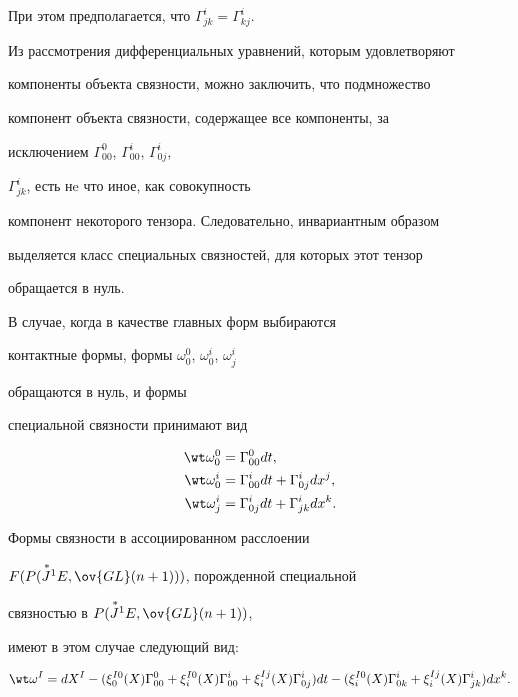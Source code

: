 При этом предполагается, что $\Gamma^i_{jk}=\Gamma^i_{kj}$. 


 


Из рассмотрения дифференциальных уравнений, которым удовлетворяют 


компоненты объекта связности, можно заключить, что подмножество 


компонент объекта связности, содержащее все компоненты, за 


исключением $\Gamma^0_{00}$, $\Gamma^i_{00}$, $\Gamma^i_{0j}$, 


$\Gamma^i_{jk}$, есть нe что иное, как совокупность 


компонент некоторого тензора. Следовательно, инвариантным образом 


выделяется класс специальных связностей, для которых этот тензор 


обращается в нуль. 


 


\begin{note} В случае, когда в качестве главных форм выбираются 


контактные формы, формы $\omega^0_0$, $\omega^i_0$, $\omega^i_j$ 


обращаются в нуль, и формы 


специальной связности принимают вид 


\begin{align*} 


\wt\omega^0_0&=\Gamma^0_{00}dt,\\ 


\wt\omega^i_0&=\Gamma^i_{00}dt+\Gamma^i_{0j}dx^j,\\ 


\wt\omega^i_j&=\Gamma^i_{0j}dt+\Gamma^i_{jk}dx^k. 


\end{align*} 


Формы связности в ассоциированном расслоении 


$F(P(\up{\,*}{J}^1 E,\ov{GL}(n+1)))$, порожденной специальной 


связностью в $P(\up{\,*}{J}^1 E,\ov{GL}(n+1))$, 


имеют в этом случае следующий вид: 


$$ 


\wt\omega^I=d X^I-(\xi^{I0}_0(X)\Gamma^0_{00}+ 


\xi^{I0}_i(X)\Gamma^i_{00}+\xi^{Ij}_i(X)\Gamma^i_{0j})dt- 


(\xi^{I0}_i(X)\Gamma^i_{0k}+\xi^{Ij}_i(X)\Gamma^i_{jk})dx^k. 


$$ 


\end{note}


